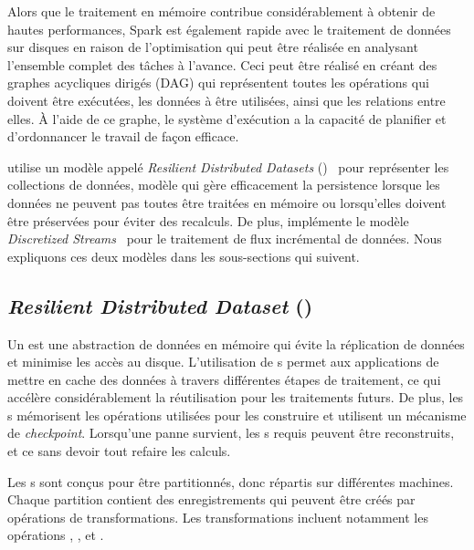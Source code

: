 Alors que le traitement en m\'emoire contribue consid\'erablement \`a obtenir de hautes performances, Spark est \'egalement rapide avec le traitement de donn\'ees sur disques en raison de l'optimisation qui peut \^etre r\'ealis\'ee en analysant l'ensemble complet des t\^aches \`a l'avance. Ceci peut \^etre r\'ealis\'e en cr\'eant des graphes acycliques dirig\'es (DAG) qui repr\'esentent toutes les op\'erations qui doivent \^etre ex\'ecut\'ees, les donn\'ees \`a \^etre utilis\'ees, ainsi que les relations entre elles. \`A l'aide de ce graphe, le syst\`eme d'ex\'ecution a la capacit\'e de planifier et d'ordonnancer le travail de fa\c{c}on efficace.

 utilise un mod\`ele appel\'e \emph{Resilient Distributed Datasets} ()~\citep{Salloum2016} pour repr\'esenter les collections de donn\'ees, mod\`ele qui g\`ere efficacement la persistence lorsque les donn\'ees ne peuvent pas toutes \^etre trait\'ees en m\'emoire ou lorsqu'elles doivent \^etre pr\'eserv\'ees pour \'eviter des recalculs. De plus,  impl\'emente le mod\`ele \emph{Discretized Streams}~\citep{zaharia2013discretized} pour le traitement de flux incr\'emental de donn\'ees.
%
Nous expliquons ces deux mod\`eles dans les sous-sections qui suivent.


\subsection{\emph{Resilient Distributed Dataset} ()}

Un  est une abstraction de donn\'ees en m\'emoire qui \'evite la r\'eplication de donn\'ees et minimise les acc\`es au disque. L'utilisation de s permet aux applications de mettre en cache des donn\'ees \`a travers diff\'erentes \'etapes de traitement, ce qui acc\'el\`ere consid\'erablement la r\'eutilisation pour les traitements futurs. De plus, les s m\'emorisent les op\'erations utilis\'ees pour les construire et utilisent un m\'ecanisme de \emph{checkpoint}. Lorsqu'une panne survient, les s requis peuvent \^etre reconstruits, et ce sans devoir tout refaire les calculs.

Les s sont conçus pour \^etre partitionn\'es, donc r\'epartis sur diff\'erentes machines. Chaque partition contient des enregistrements qui peuvent \^etre cr\'e\'es par op\'erations de transformations. Les transformations incluent notamment les opérations , ,  et .



